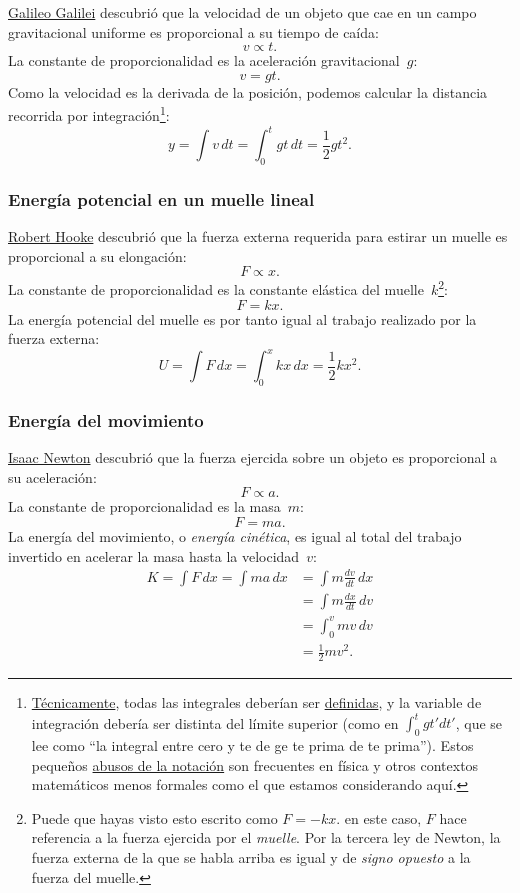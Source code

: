 \href{https://es.wikipedia.org/wiki/Galileo_Galilei}{Galileo Galilei} descubrió que la velocidad de un objeto que cae en un campo gravitacional uniforme es proporcional a su tiempo de caída:
\[ v \propto t. \]
La constante de proporcionalidad es la aceleración gravitacional~$g$:
\[ v = g t. \]
Como la velocidad es la derivada de la posición, podemos calcular la distancia recorrida por integración\footnote{\href{https://m.xkcd.com/1475/}{Técnicamente}, todas las integrales deberían ser \href{https://mathworld.wolfram.com/DefiniteIntegral.html}{definidas}, y la variable de integración debería ser distinta del límite superior (como en $\int_0^t gt' dt'$, que se lee como ``la integral entre cero y te de ge te prima de te prima''). Estos pequeños \href{https://en.wikipedia.org/wiki/Abuse_of_notation}{abusos de la notación} son frecuentes en física y otros contextos matemáticos menos formales como el que estamos considerando aquí.}:
\[ y = \int v\,dt = \int_0^t gt\,dt = \textstyle{\frac{1}{2}} gt^2. \]


    \subsubsection{Energía potencial en un muelle lineal} %
    \label{sec:potential_energy_in_a_linear_spring}

\href{https://es.wikipedia.org/wiki/Robert_Hooke}{Robert Hooke} descubrió que la fuerza externa requerida para estirar un muelle es proporcional a su elongación:
\[ F \propto x. \]
La constante de proporcionalidad es la constante elástica del muelle~$k$\footnote{Puede que hayas visto esto escrito como $F = -kx$. en este caso, $F$ hace referencia a la fuerza ejercida por el \emph{muelle}. Por la tercera ley de Newton, la fuerza externa de la que se habla arriba es igual y de \emph{signo opuesto} a la fuerza del muelle.}:
\[ F = k x. \]
La energía potencial del muelle es por tanto igual al trabajo realizado por la fuerza externa:
\[ U = \int F\,dx = \int_0^x kx\,dx = \textstyle{\frac{1}{2}} kx^2. \]

    \subsubsection{Energía del movimiento} %
    \label{sec:energy_of_motion}

\href{https://es.wikipedia.org/wiki/Isaac_Newton}{Isaac Newton} descubrió que la fuerza ejercida sobre un objeto es proporcional a su aceleración:
\[ F \propto a. \]
La constante de proporcionalidad es la masa~$m$:
\[ F = m a. \]
La energía del movimiento, o \emph{energía cinética}, es igual al total del trabajo invertido en acelerar la masa hasta la velocidad~$v$:
\[
\begin{split}
K = \int F\,dx = \int ma\,dx & = \int m\frac{dv}{dt}\,dx \\ & = \int m\frac{dx}{dt}\,dv \\ & = \int_0^v mv\,dv \\ & = \textstyle{\frac{1}{2}} mv^2.
\end{split}
\]

